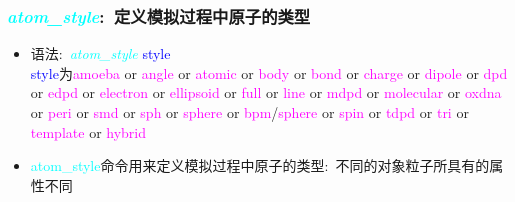 \frame
{
	\frametitle{\textcolor{cyan}{\textit{atom\_style}}:~定义模拟过程中原子的类型}
	\begin{itemize}
		\item 语法:~\textcolor{cyan}{\textit{atom\_style}} \textrm{\textcolor{blue}{style}}\\
			\textrm{\textcolor{blue}{style}}为\textrm{\textcolor{magenta}{amoeba} or \textcolor{magenta}{angle} or \textcolor{magenta}{atomic} or \textcolor{magenta}{body} or \textcolor{magenta}{bond} or \textcolor{magenta}{charge} or \textcolor{magenta}{dipole} or \textcolor{magenta}{dpd} or \textcolor{magenta}{edpd} or \textcolor{magenta}{electron} or \textcolor{magenta}{ellipsoid} or \textcolor{magenta}{full} or \textcolor{magenta}{line} or \textcolor{magenta}{mdpd} or \textcolor{magenta}{molecular} or \textcolor{magenta}{oxdna} or \textcolor{magenta}{peri} or \textcolor{magenta}{smd} or \textcolor{magenta}{sph} or \textcolor{magenta}{sphere} or \textcolor{magenta}{bpm}/\textcolor{magenta}{sphere} or \textcolor{magenta}{spin} or \textcolor{magenta}{tdpd} or \textcolor{magenta}{tri} or \textcolor{magenta}{template} or \textcolor{magenta}{hybrid}}
		\item \textcolor{cyan}{atom\_style}命令用来定义模拟过程中原子的类型:~不同的对象粒子所具有的属性不同
	\end{itemize}
{\fontsize{7.5pt}{5.2pt}\selectfont{
	\textcolor{red}{对于某个粒子对象，粒子不存在的属性就不需要设置，以便节省内存，加速运算}}}
\vskip 5pt
{\fontsize{6.2pt}{5.2pt}}
}

